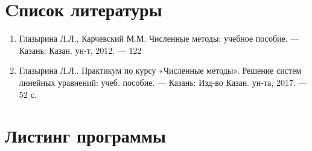 \documentclass[a4paper,12pt]{article}
\begin{document}
\section{Cписок литературы}
\begin{enumerate}
    \item Глазырина Л.Л., Карчевский М.М. Численные методы: учебное пособие. — Казань: Казан.
    ун-т, 2012. — 122 
    \item Глазырина Л.Л.. Практикум по курсу «Численные методы». Решение
    систем линейных уравнений: учеб. пособие. — Казань: Изд-во Казан. ун-та, 2017. — 52 с.
\end{enumerate}
\clearpage
\section{Листинг программы}


\end{document}
